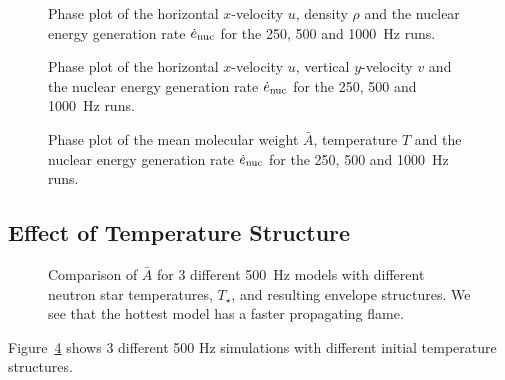 \documentclass[preprint,times,tighten]{aastex63}
\begin{document}
\begin{figure}[t]
    \centering
    \caption{\label{fig:urho}Phase plot of the horizontal $x$-velocity $u$, density $\rho$ and the nuclear energy generation rate $\dot{e}_{\rm nuc}$ for the 250, 500 and 1000~Hz runs.}
\end{figure}

\begin{figure}[t]
    \centering
    \caption{\label{fig:uv}Phase plot of the horizontal $x$-velocity $u$, vertical $y$-velocity $v$ and the nuclear energy generation rate $\dot{e}_{\rm nuc}$ for the 250, 500 and 1000~Hz runs.}
\end{figure}

\begin{figure}[t]
    \centering
    \caption{\label{fig:abar}Phase plot of the mean molecular weight $\bar{A}$, temperature $T$ and the nuclear energy generation rate $\dot{e}_{\rm nuc}$ for the 250, 500 and 1000~Hz runs.}
\end{figure}
    

\subsection{Effect of Temperature Structure}

\begin{figure}[t]
\centering
{}
\caption{\label{fig:compare_500Hz_abar} Comparison of $\bar{A}$ for 3 different 500~Hz models with different neutron star temperatures, $T_\star$, and resulting envelope
structures.  We see that the hottest model has a faster propagating flame.}
\end{figure}

Figure~\ref{fig:compare_500Hz_abar} shows 3 different 500 Hz simulations with different initial temperature structures.
\end{document}
